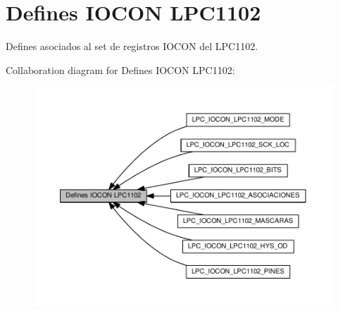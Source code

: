 \hypertarget{group___l_p_c___i_o_c_o_n___l_p_c1102___d_e_f_i_n_e_s}{}\section{Defines I\+O\+C\+ON L\+P\+C1102}
\label{group___l_p_c___i_o_c_o_n___l_p_c1102___d_e_f_i_n_e_s}


Defines asociados al set de registros I\+O\+C\+ON del L\+P\+C1102.  


Collaboration diagram for Defines I\+O\+C\+ON L\+P\+C1102\+:\nopagebreak
\begin{figure}[H]
\begin{center}
\leavevmode
\includegraphics[width=350pt]{group___l_p_c___i_o_c_o_n___l_p_c1102___d_e_f_i_n_e_s}
\end{center}
\end{figure}
